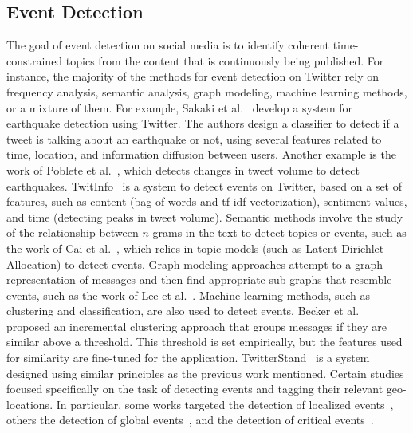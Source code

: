 \subsection{Event Detection} 
%
The goal of event detection on social media is to identify coherent
time-constrained topics from the content that is continuously being published.
%
For instance, the majority of the methods for event detection on Twitter rely on
frequency analysis, semantic analysis, graph modeling, machine learning methods,
or a mixture of them.
%
For example, Sakaki et al.~\cite{Sakaki2010} develop a system for earthquake
detection using Twitter.
%
The authors design a classifier to detect if a tweet is talking about an
earthquake or not, using several features related to time, location, and
information diffusion between users.
%
Another example is the work of Poblete et al.~\cite{poblete2018robust}, which
detects changes in tweet volume to detect earthquakes.
%
TwitInfo~\cite{Marcus:2011:TAV:1978942.1978975} is a system to detect events on
Twitter, based on a set of features, such as content (bag of words and tf-idf
vectorization), sentiment values, and time (detecting peaks in tweet volume).
%
Semantic methods involve the study of the relationship between $n$-grams in the
text to detect topics or events, such as the work of Cai et
al.~\cite{cai2015popular}, which relies in topic models (such as Latent
Dirichlet Allocation) to detect events.
%
Graph modeling approaches attempt to a graph representation of messages
and then find appropriate sub-graphs that resemble events, such as the work of
Lee et al.~\cite{Lee:2013:KSK:2487575.2487711,Lee:2014:CCS:2661829.2661859}.
%
Machine learning methods, such as clustering and classification, are also used
to detect events.
%
Becker et al.~\cite{Becker:2010:LSM:1718487.1718524} proposed an incremental
clustering approach that groups messages if they are similar above a threshold.
%
This threshold is set empirically, but the features used for similarity are
fine-tuned for the application.
%
TwitterStand~\cite{Sankaranarayanan:2009:TNT:1653771.1653781} is a system
designed using similar principles as the previous work mentioned.
%
Certain studies focused specifically on the task of detecting events and tagging
their relevant geo-locations.  
%
In particular, some works targeted the detection of localized
events~\cite{Watanabe:Jasmine:2011,Abdelhaq:EvenTweet:2013,Walther:2013fb,Lee:A:2011,Krumm:2015},
others the detection of global events~\cite{sankaranarayanan:twitterstand:2009},
and the detection of critical
events~\cite{Sakaki:Tweet:2013,DeLongueville:2009}.
